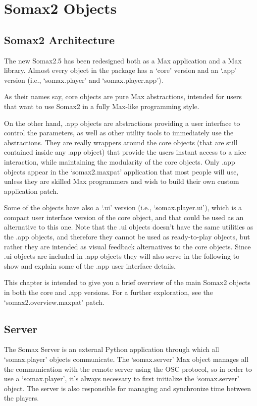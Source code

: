 \chapter{Somax2 Objects}\label{sec:objects}

\section{Somax2 Architecture}
The new Somax2.5 has been redesigned both as a Max application and a Max library. Almost every object in the package has a `core' version and an `.app' version (i.e., `somax.player' and `somax.player.app'). 

As their names say, core objects are pure Max abstractions, intended for users that want to use Somax2 in a fully Max-like programming style. 

On the other hand, .app objects are abstractions providing a user interface to control the parameters, as well as other utility tools to immediately use the abstractions. They are really wrappers around the core objects (that are still contained inside any .app object) that provide the users instant access to a nice interaction, while maintaining the modularity of the core objects. 
Only .app objects appear in the `somax2.maxpat' application that most people will use, unless they are skilled Max programmers and wish to build their own custom application patch.

Some of the objects have also a `.ui' version (i.e., `somax.player.ui'), which is a compact user interface version of the core object, and that could be used as an alternative to this one. Note that the .ui objects doesn't have the same utilities as the .app objects, and therefore they cannot be used as ready-to-play objects, but rather they are intended as visual feedback alternatives to the core objects. Since .ui objects are included in .app objects they will also serve in the following to show and explain some of the .app user interface details.

This chapter is intended to give you a brief overview of the main Somax2 objects in both the core and .app versions. For a further exploration, see the `somax2.overview.maxpat' patch.



\section{Server}

The Somax Server is an external Python application through which all `somax.player' objects communicate. The `somax.server' Max object manages all the communication with the remote server using the OSC protocol, so in order to use a `somax.player', it's always necessary to first initialize the `somax.server' object. The server is also responsible for managing and synchronize time between the players. 

